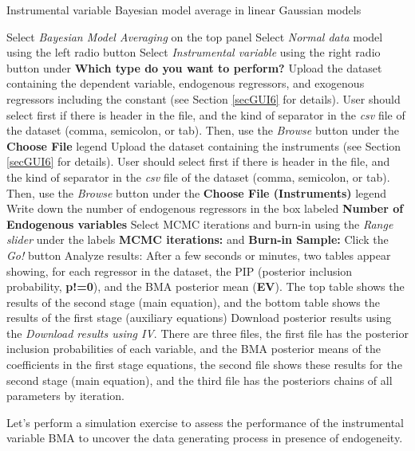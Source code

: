 \begin{algorithm}[h!]
	\caption{Instrumental variable Bayesian model average in linear Gaussian models}\label{alg:BMAIV}
	\begin{algorithmic}[1]  		 			
		\State Select \textit{Bayesian Model Averaging} on the top panel
		\State Select \textit{Normal data} model using the left radio button
		\State Select \textit{Instrumental variable} using the right radio button under \textbf{Which type do you want to perform?}
		\State Upload the dataset containing the dependent variable, endogenous regressors, and exogenous regressors including the constant (see Section \ref{secGUI6} for details).  User should select first if there is header in the file, and the kind of separator in the \textit{csv} file of the dataset (comma, semicolon, or tab). Then, use the \textit{Browse} button under the \textbf{Choose File} legend
		\State Upload the dataset containing the instruments (see Section \ref{secGUI6} for details).  User should select first if there is header in the file, and the kind of separator in the \textit{csv} file of the dataset (comma, semicolon, or tab). Then, use the \textit{Browse} button under the \textbf{Choose File (Instruments)} legend
		\State Write down the number of endogenous regressors in the box labeled \textbf{Number of Endogenous variables}
		\State Select MCMC iterations and burn-in using the \textit{Range slider} under the labels \textbf{MCMC iterations:} and \textbf{Burn-in Sample:}
		\State Click the \textit{Go!} button
		\State Analyze results: After a few seconds or minutes, two tables appear showing, for each regressor in the dataset, the PIP (posterior inclusion probability, \textbf{p!=0}), and the BMA posterior mean (\textbf{EV}). The top table shows the results of the second stage (main equation), and the bottom table shows the results of the first stage (auxiliary equations)
		\State Download posterior results using the \textit{Download results using IV}. There are three files, the first file has the posterior inclusion probabilities of each variable, and the BMA posterior means of the coefficients in the first stage equations, the second file shows these results for the second stage (main equation), and the third file has the posteriors chains of all parameters by iteration. 
	\end{algorithmic} 
\end{algorithm}
Let's perform a simulation exercise to assess the performance of the instrumental variable BMA to uncover the data generating process in presence of endogeneity.\\

